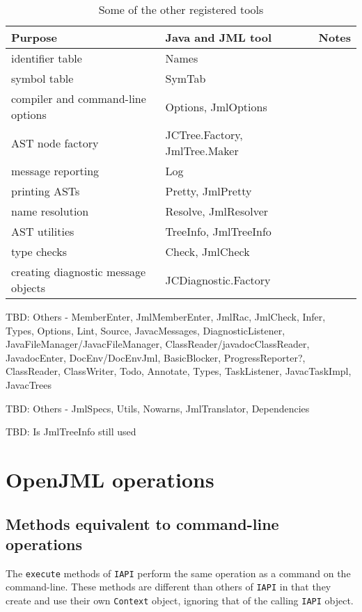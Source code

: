 \begin{table}[bth]
\begin{center}
\begin{tabular}{|l|l|l|}

\hline
Purpose & Java and JML tool &  Notes \\
\hline
identifier table & Names & \\
\hline
symbol table & SymTab & \\
\hline
compiler and command-line options & Options, JmlOptions & \\
\hline
AST node factory & JCTree.Factory, JmlTree.Maker & \\
\hline
message reporting & Log & \\
\hline
printing ASTs & Pretty, JmlPretty & \\
\hline
name resolution & Resolve, JmlResolver & \\
\hline
AST utilities & TreeInfo, JmlTreeInfo & \\
\hline
type checks & Check, JmlCheck & \\
\hline
creating diagnostic message objects & JCDiagnostic.Factory & \\
\hline
\end{tabular}
\end{center}
\caption{Some of the other registered tools}
\label{Tools2}
\end{table}

TBD: Others - MemberEnter, JmlMemberEnter, JmlRac, JmlCheck, Infer, Types, Options, Lint, Source, JavacMessages, DiagnosticListener, JavaFileManager/JavacFileManager, ClassReader/javadocClassReader, JavadocEnter, DocEnv/DocEnvJml, BasicBlocker, ProgressReporter?, ClassReader, ClassWriter, Todo, Annotate, Types, TaskListener, JavacTaskImpl, JavacTrees

TBD: Others - JmlSpecs, Utils, Nowarns, JmlTranslator, Dependencies

TBD: Is JmlTreeInfo still used

\section{OpenJML operations}

\subsection{Methods equivalent to command-line operations}

The {\tt execute} methods of {\tt IAPI} perform the same operation as a command on the command-line.
These methods are different than others of {\tt IAPI} in that they create and use their own {\tt Context}
object, ignoring that of the calling {\tt IAPI} object.

